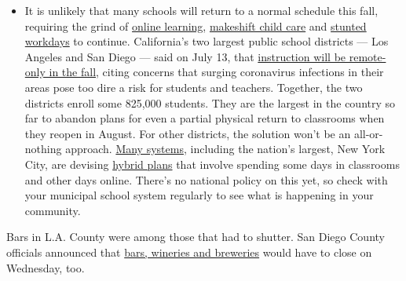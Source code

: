 \begin{itemize}
  \begin{itemize}
  \tightlist
  \item
    It is unlikely that many schools will return to a normal schedule
    this fall, requiring the grind of
    \href{https://www.nytimes.com/2020/06/05/us/coronavirus-education-lost-learning.html?action=click\&pgtype=Article\&state=default\&region=MAIN_CONTENT_3\&context=storylines_faq}{online
    learning},
    \href{https://www.nytimes.com/2020/05/29/us/coronavirus-child-care-centers.html?action=click\&pgtype=Article\&state=default\&region=MAIN_CONTENT_3\&context=storylines_faq}{makeshift
    child care} and
    \href{https://www.nytimes.com/2020/06/03/business/economy/coronavirus-working-women.html?action=click\&pgtype=Article\&state=default\&region=MAIN_CONTENT_3\&context=storylines_faq}{stunted
    workdays} to continue. California's two largest public school
    districts --- Los Angeles and San Diego --- said on July 13, that
    \href{https://www.nytimes.com/2020/07/13/us/lausd-san-diego-school-reopening.html?action=click\&pgtype=Article\&state=default\&region=MAIN_CONTENT_3\&context=storylines_faq}{instruction
    will be remote-only in the fall}, citing concerns that surging
    coronavirus infections in their areas pose too dire a risk for
    students and teachers. Together, the two districts enroll some
    825,000 students. They are the largest in the country so far to
    abandon plans for even a partial physical return to classrooms when
    they reopen in August. For other districts, the solution won't be an
    all-or-nothing approach.
    \href{https://bioethics.jhu.edu/research-and-outreach/projects/eschool-initiative/school-policy-tracker/}{Many
    systems}, including the nation's largest, New York City, are
    devising
    \href{https://www.nytimes.com/2020/06/26/us/coronavirus-schools-reopen-fall.html?action=click\&pgtype=Article\&state=default\&region=MAIN_CONTENT_3\&context=storylines_faq}{hybrid
    plans} that involve spending some days in classrooms and other days
    online. There's no national policy on this yet, so check with your
    municipal school system regularly to see what is happening in your
    community.
  \end{itemize}
\end{itemize}

Bars in L.A. County were among those that had to shutter. San Diego
County officials announced that
\href{https://www.sandiegouniontribune.com/news/health/story/2020-06-29/bars-to-close-wednesday-as-county-health-department-responds-to-local-covid-surge}{bars,
wineries and breweries} would have to close on Wednesday, too.


